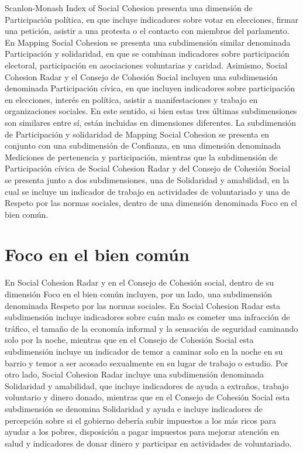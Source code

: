 \documentclass[
  12pt,
]{book}
\begin{document}
Scanlon-Monash Index of Social Cohesion presenta una dimensión de Participación política, en que incluye indicadores sobre votar en elecciones, firmar una petición, asistir a una protesta o el contacto con miembros del parlamento. En Mapping Social Cohesion se presenta una subdimensión similar denominada Participación y solidaridad, en que se combinan indicadores sobre participación electoral, participación en asociaciones voluntarias y caridad. Asimismo, Social Cohesion Radar y el Consejo de Cohesión Social incluyen una subdimensión denominada Participación cívica, en que incluyen indicadores sobre participación en elecciones, interés en política, asistir a manifestaciones y trabajo en organizaciones sociales. En este sentido, si bien estas tres últimas subdimensiones son similares entre sí, están incluidas en dimensiones diferentes. La subdimensión de Participación y solidaridad de Mapping Social Cohesion se presenta en conjunto con una subdimensión de Confianza, en una dimensión denominada Mediciones de pertenencia y participación, mientras que la subdimensión de Participación cívica de Social Cohesion Radar y del Consejo de Cohesión Social se presenta junto a dos subdimensiones, una de Solidaridad y amabilidad, en la cual se incluye un indicador de trabajo en actividades de voluntariado y una de Respeto por las normas sociales, dentro de una dimensión denominada Foco en el bien común.

\hypertarget{foco-en-el-bien-comuxfan}{%
\section{Foco en el bien común}\label{foco-en-el-bien-comuxfan}}

En Social Cohesion Radar y en el Consejo de Cohesión social, dentro de su dimensión Foco en el bien común incluyen, por un lado, una subdimensión denominada Respeto por las normas sociales. En Social Cohesion Radar esta subdimensión incluye indicadores sobre cuán malo es cometer una infracción de tráfico, el tamaño de la economía informal y la sensación de seguridad caminando solo por la noche, mientras que en el Consejo de Cohesión Social esta subdimensión incluye un indicador de temor a caminar solo en la noche en su barrio y temor a ser acosado sexualmente en su lugar de trabajo o estudio. Por otro lado, Social Cohesion Radar incluye una subdimensión denominada Solidaridad y amabilidad, que incluye indicadores de ayuda a extraños, trabajo voluntario y dinero donado, mientras que en el Consejo de Cohesión Social esta subdimensión se denomina Solidaridad y ayuda e incluye indicadores de percepción sobre si el gobierno debería subir impuestos a los más ricos para ayudar a los pobres, disposición a pagar impuestos para mejorar atención en salud y indicadores de donar dinero y participar en actividades de voluntariado.
\end{document}

